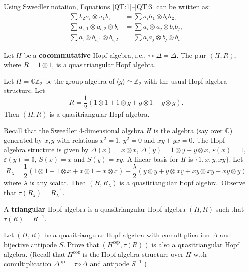 Using Sweedler notation, Equations \eqref{QT:1}--\eqref{QT:3} can
be written as:
\begin{align*}
\sum h_{2}a_{i}\otimes h_{1}b_{i} & =\sum a_{i}h_{1}\otimes b_{i}h_{2},\\
\sum a_{i,1}\otimes a_{i,2}\otimes b_{i} & =\sum a_{i}\otimes a_{j}\otimes b_{i}b_{j},\\
\sum a_{i}\otimes b_{i,1}\otimes b_{i,2} & =\sum a_{i}a_{j}\otimes b_{j}\otimes b_{i}.
\end{align*}

\begin{example}
Let $H$ be a \textbf{cocommutative} Hopf algebra, i.e.,
$\tau\circ\Delta=\Delta$.  The pair $(H,R)$, where $R=1\otimes1$, is a
quasitriangular Hopf algebra.
\end{example}

\begin{example}
Let $H=\mathbb{C}\mathbb{Z}_{2}$ be the group algebra of $\langle
g\rangle\simeq\mathbb{Z}_{2}$ with the usual Hopf algebra structure. Let 
\[
R=\frac{1}{2}(1\otimes1+1\otimes g+g\otimes1-g\otimes g).
\]
Then $(H,R)$ is a quasitriangular Hopf algebra.
\end{example}

\begin{example}
Recall that the Sweedler 4-dimensional algebra $H$ is the algebra (say over
$\mathbb{C}$) generated by $x,y$ with relations $x^{2}=1$, $y^{2}=0$ and
$xy+yx=0$.  The Hopf algebra structure is given by $\Delta(x)=x\otimes x$,
$\Delta(y)=1\otimes y+y\otimes x$, $\varepsilon(x)=1$, $\varepsilon(y)=0$,
$S(x)=x$ and $S(y)=xy$.  A linear basis for $H$ is $\{1,x,y,xy\}$. Let
\[
R_{\lambda}=\frac{1}{2}(1\otimes1+1\otimes x+x\otimes1-x\otimes x)+\frac{\lambda}{2}(y\otimes y+y\otimes xy+xy\otimes xy-xy\otimes y)
\]
where $\lambda$ is any scalar. Then $(H,R_{\lambda})$ is a quasitriangular
Hopf algebra. Observe that $\tau(R_{\lambda})=R_{\lambda}^{-1}$.
\end{example}

\begin{definition}
A \textbf{triangular} Hopf algebra is a quasitriangular Hopf algebra
$(H,R)$ such that $\tau(R)=R^{-1}$. 
\end{definition}

\begin{exercise}
Let $(H,R)$ be a quasitriangular Hopf algebra with comultiplication $\Delta$
and bijective antipode $S$. Prove that $(H^{\mathrm{cop}},\tau(R))$ is also a
quasitriangular Hopf algebra. (Recall that $H^{\mathrm{cop}}$ is the Hopf
algebra structure over $H$ with comultiplication
$\Delta^{\mathrm{op}}=\tau\circ\Delta$ and antipode $S^{-1}$.)
\end{exercise}

